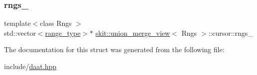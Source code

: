 \mbox{\label{structskit_1_1union__merge__view_1_1cursor_a6bbcfa016ea7479567838a2e3db2f8d9}} 
\subsubsection{\texorpdfstring{rngs\+\_\+}{rngs\_}}
{\footnotesize\ttfamily template$<$class Rngs $>$ \\
std\+::vector$<$\hyperlink{structskit_1_1union__merge__view_1_1cursor_aca3870894a5b4e031b79496118e9ca60}{range\+\_\+type}$>$$\ast$ \hyperlink{classskit_1_1union__merge__view}{skit\+::union\+\_\+merge\+\_\+view}$<$ Rngs $>$\+::cursor\+::rngs\+\_\+}



The documentation for this struct was generated from the following file\+:\begin{DoxyCompactItemize}
\item 
include/\hyperlink{daat_8hpp}{daat.\+hpp}\end{DoxyCompactItemize}

